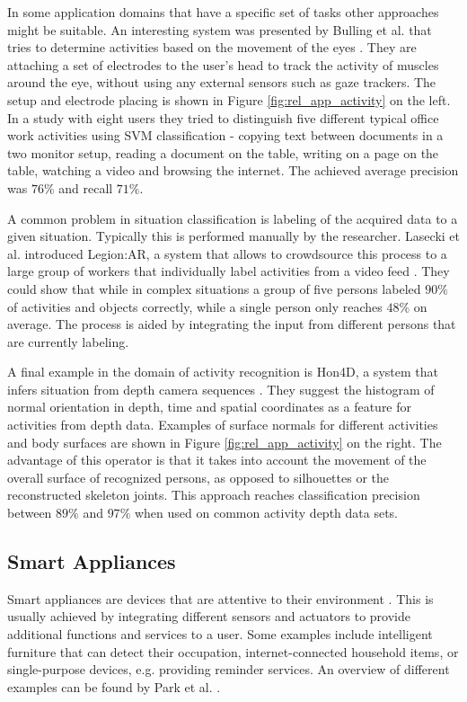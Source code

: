 In some application domains that have a specific set of tasks other approaches might be suitable. An interesting system was presented by Bulling et al. that tries to determine activities based on the movement of the eyes \cite{bulling2011eye}. They are attaching a set of electrodes to the user's head to track the activity of muscles around the eye, without using any external sensors such as gaze trackers. The setup and electrode placing is shown in Figure \ref{fig:rel_app_activity} on the left. In a study with eight users they tried to distinguish five different typical office work activities using SVM classification - copying text between documents in a two monitor setup, reading a document on the table, writing on a page on the table, watching a video and browsing the internet. The achieved average precision was $76\%$ and recall $71\%$.

A common problem in situation classification is labeling of the acquired data to a given situation. Typically this is performed manually by the researcher. Lasecki et al. introduced Legion:AR, a system that allows to crowdsource this process to a large group of workers that individually label activities from a video feed \cite{lasecki2013real}. They could show that while in complex situations a group of five persons labeled $90\%$ of activities and objects correctly, while a single person only reaches $48\%$ on average. The process is aided by integrating the input from different persons that are currently labeling.

A final example in the domain of activity recognition is Hon4D, a system that infers situation from depth camera sequences \cite{oreifej2013hon4d}. They suggest the histogram of normal orientation in depth, time and spatial coordinates as a feature for activities from depth data. Examples of surface normals for different activities and body surfaces are shown in Figure \ref{fig:rel_app_activity} on the right. The advantage of this operator is that it takes into account the movement of the overall surface of recognized persons, as opposed to silhouettes or the reconstructed skeleton joints. This approach reaches classification precision between $89\%$ and $97\%$ when used on common activity depth data sets. 

\subsection{Smart Appliances}
Smart appliances are devices that are attentive to their environment \cite{schmidt2001build}. This is usually achieved by integrating different sensors and actuators to provide additional functions and services to a user. Some examples include intelligent furniture that can detect their occupation, internet-connected household items, or single-purpose devices, e.g. providing reminder services. An overview of different examples can be found by Park et al. \cite{park2003smart}. 

